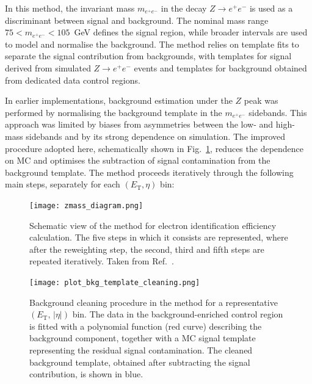 In this method, the invariant mass $m_{e^+e^-}$ in the decay $Z\rightarrow e^+e^-$ is used as a discriminant between signal and background. The nominal mass range $75 < m_{e^+e^-} < 105$~GeV defines the signal region, while broader intervals are used to model and normalise the background. The method relies on template fits to separate the signal contribution from backgrounds, with templates for signal derived from simulated $Z\rightarrow e^+e^-$ events and templates for background obtained from dedicated data control regions.

In earlier implementations, background estimation under the $Z$ peak was performed by normalising the background template in the $m_{e^+e^-}$ sidebands. This approach was limited by biases from asymmetries between the low- and high-mass sidebands and by its strong dependence on simulation. The improved procedure adopted here, schematically shown in Fig.~\ref{fig:zmass_algo}, reduces the dependence on MC and optimises the subtraction of signal contamination from the background template. The method proceeds iteratively through the following main steps, separately for each $(E_{\mathrm{T}},\eta)$ bin:

\begin{figure}[htbp]
  \centering
  \texttt{[image: zmass\_diagram.png]}
  \caption{Schematic view of the \zmass method for electron identification efficiency calculation. The five steps in which it consists are represented, where after the reweighting step, the second, third and fifth steps are repeated iteratively. Taken from Ref.~\cite{elias_thesis}. }
  \label{fig:zmass_algo}
\end{figure}

\begin{figure}[htbp]
  \centering
  \texttt{[image: plot\_bkg\_template\_cleaning.png]}
  \caption{Background cleaning procedure in the \zmass method for a representative $(E_{\mathrm{T}},\,|\eta|)$ bin. The data in the background-enriched control region is fitted with a polynomial function (red curve) describing the background component, together with a MC signal template representing the residual signal contamination. The cleaned background template, obtained after subtracting the signal contribution, is shown in blue.}
  \label{fig:bkg_clean}
\end{figure}

